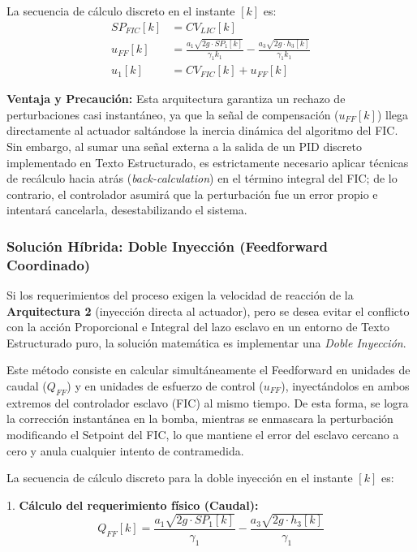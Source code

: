 La secuencia de cálculo discreto en el instante $[k]$ es:
\begin{align}
    SP_{FIC}[k] &= CV_{LIC}[k] \label{eq:sp_fic_direct} \\
    u_{FF}[k] &= \frac{a_1 \sqrt{2g \cdot SP_1[k]}}{\gamma_1 k_1} - \frac{a_3 \sqrt{2g \cdot h_3[k]}}{\gamma_1 k_1} \label{eq:ff_esfuerzo} \\
    u_1[k] &= CV_{FIC}[k] + u_{FF}[k] \label{eq:u_arch2}
\end{align}

\textbf{Ventaja y Precaución:} Esta arquitectura garantiza un rechazo de perturbaciones casi instantáneo, ya que la señal de compensación ($u_{FF}[k]$) llega directamente al actuador saltándose la inercia dinámica del algoritmo del FIC. Sin embargo, al sumar una señal externa a la salida de un PID discreto implementado en Texto Estructurado, es estrictamente necesario aplicar técnicas de recálculo hacia atrás (\textit{back-calculation}) en el término integral del FIC; de lo contrario, el controlador asumirá que la perturbación fue un error propio e intentará cancelarla, desestabilizando el sistema.



\subsubsection{Solución Híbrida: Doble Inyección (Feedforward Coordinado)}

Si los requerimientos del proceso exigen la velocidad de reacción de la \textbf{Arquitectura 2} (inyección directa al actuador), pero se desea evitar el conflicto con la acción Proporcional e Integral del lazo esclavo en un entorno de Texto Estructurado puro, la solución matemática es implementar una \textit{Doble Inyección}.

Este método consiste en calcular simultáneamente el Feedforward en unidades de caudal ($Q_{FF}$) y en unidades de esfuerzo de control ($u_{FF}$), inyectándolos en ambos extremos del controlador esclavo (FIC) al mismo tiempo. De esta forma, se logra la corrección instantánea en la bomba, mientras se enmascara la perturbación modificando el Setpoint del FIC, lo que mantiene el error del esclavo cercano a cero y anula cualquier intento de contramedida.

La secuencia de cálculo discreto para la doble inyección en el instante $[k]$ es:

1. \textbf{Cálculo del requerimiento físico (Caudal):}
   $$Q_{FF}[k] = \frac{a_1 \sqrt{2g \cdot SP_1[k]}}{\gamma_1} - \frac{a_3 \sqrt{2g \cdot h_3[k]}}{\gamma_1}$$

